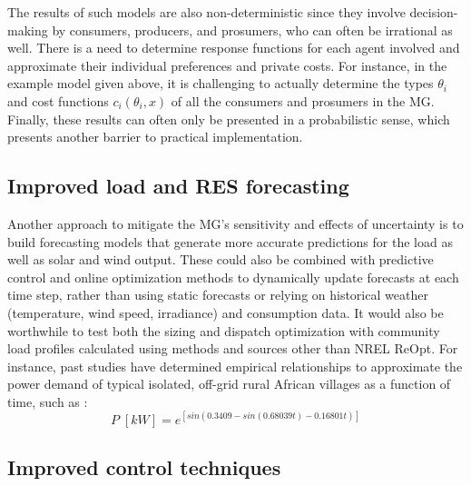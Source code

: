 \documentclass[final,3p,times]{elsarticle}
\begin{document}
The results of such models are also non-deterministic since they involve decision-making by consumers, producers, and prosumers, who can often be irrational as well. There is a need to determine response functions for each agent involved and approximate their individual preferences and private costs. For instance, in the example model given above, it is challenging to actually determine the types $\theta_i$ and cost functions $c_i(\theta_i,x)$ of all the consumers and prosumers in the MG. Finally, these results can often only be presented in a probabilistic sense, which presents another barrier to practical implementation.

\subsection{Improved load and RES forecasting}

Another approach to mitigate the MG's sensitivity and effects of uncertainty is to build forecasting models that generate more accurate predictions for the load as well as solar and wind output. These could also be combined with predictive control and online optimization methods to dynamically update forecasts at each time step, rather than using static forecasts or relying on historical weather (temperature, wind speed, irradiance) and consumption data. It would also be worthwhile to test both the sizing and dispatch optimization with community load profiles calculated using methods and sources other than NREL ReOpt. For instance, past studies have determined empirical relationships to approximate the power demand of typical isolated, off-grid rural African villages as a function of time, such as \cite{load_profile}:
\begin{equation}
    P \; [kW] = e^{[sin(0.3409 - sin(0.68039t) - 0.16801t)]}
\end{equation}


\subsection{Improved control techniques \label{app:improvements}}
\end{document}
